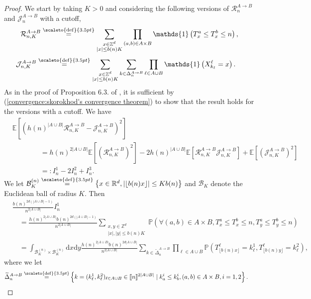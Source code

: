 \documentclass[12pt]{article}
\newcommand{\RR}{\mathbb R}
\newcommand{\EE}{\mathbb E}
\newcommand{\PP}{\mathbb P}
\newcommand{\1}{\mathds{1}}
\newcommand{\ZZ}{\mathbb Z}
\renewcommand{\d}{\mathrm d}
\newcommand{\eqdef}{\stackrel{\scaleto{\mathrm{def}}{3.5pt}}{=}}
\numberwithin{equation}{section}
\begin{document}
\begin{proof}
    We start by taking $K>0$ and considering the following versions of $\mathcal R_n^{A\rightarrow B}$ and $\mathcal J_n^{A\rightarrow B}$ with a cutoff,
    \begin{equation*}
        \mathcal R_{n,K}^{A\rightarrow B}\eqdef\sum_{\substack{x\in\ZZ^d \\ |x|\le b(n)K}}\prod_{(a,b)\in A\times B}\1\left(T_x^a\le T_x^b\le n\right),
    \end{equation*}
    \begin{align*}
        \mathcal J_{n,K}^{A\rightarrow B}&\eqdef\sum_{\substack{x\in\ZZ^d \\ |x|\le b(n) K}}\sum_{k\in\Delta_n^{A\rightarrow B}}\prod_{\ell\in A\cup B}\1\left(X_{k_\ell}^{\ell}=x\right).
    \end{align*}
    As in the proof of Proposition $6.3.$ of \cite{LeGallRosenRangeOfStableRandomWalks1991}, it is sufficient by (\ref{convergence:skorokhod's convergence theorem}) to show that the result holds for the versions with a cutoff. We have
    \begin{align*}
        &\EE\left[\left(h(n)^{|A\cup B|}\mathcal R_{n,K}^{A\rightarrow B}-\mathcal J_{n,K}^{A\rightarrow B}\right)^2\right]\\
        &\hspace{4em}=h(n)^{2|A\cup B|}\EE\left[\left(\mathcal R_{n,K}^{A\rightarrow B}\right)^2\right]-2h(n)^{|A\cup B|}\EE\left[\mathcal R_{n,K}^{A\rightarrow B}\mathcal J_{n,K}^{A\rightarrow B}\right]+\EE\left[\left(\mathcal J_{n,K}^{A\rightarrow B}\right)^2\right]\\
        &\hspace{4em}=:I_n^1-2I_n^2+I_n^3.
    \end{align*}
    We let $\mathcal B_{K}^{(n)}\eqdef\left\{x\in\RR^d, |\lfloor b(n) x\rfloor|\le K b(n)\right\}$ and $\mathcal B_K$ denote the Euclidean ball of radius $K$. Then
    \begin{align}
        &\frac{b(n)^{2d(|A\cup B|-1)}}{n^{2|A\cup B|}}I_n^1\nonumber\\
        &\hspace{1em}=\frac{h(n)^{2|A\cup B|}b(n)^{2d(|A\cup B|-1)}}{n^{2|A\cup B|}}\sum_{\substack{x,y\in\ZZ^d \\ |x|,|y|\le b(n) K}}\PP\left(\forall(a,b)\in A\times B,T_x^{a}\le T_x^{b}\le n, T_y^{a}\le T_y^{b}\le n\right)\nonumber\\
        &\hspace{1em}=\int_{\mathcal B_K^{(n)}\times\mathcal B_K^{(n)}}\d x\d y\frac{h(n)^{2|A\cup B|}b(n)^{2d|A\cup B|}}{n^{2|A\cup B|}}\sum_{k\in\widetilde\Delta_n^{A\rightarrow B}}\prod_{\ell\in A\cup B}\PP\left(T_{\lfloor b(n)x\rfloor}^{\ell}=k^1_{\ell},T_{\lfloor b(n)y\rfloor}^{\ell}=k_\ell^2\right),\label{eq:modified expression of I_n^1}
    \end{align}
    where we let 
    \begin{align*}
        \widetilde \Delta_n^{A\rightarrow B}\eqdef&\left\{k=(k_\ell^1,k_\ell^2)_{\ell\in A\cup B}\in[\![n]\!]^{2|A\cup B|}\mid k^i_{a}\le k^i_{{b}}, (a,b)\in A\times B, i=1,2\right\}.
    \end{align*}


\end{proof}
\end{document}
